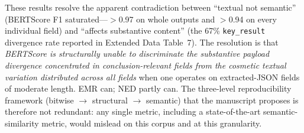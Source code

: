 \documentclass[11pt]{article}
\begin{document}
These results resolve the apparent contradiction between ``textual not semantic'' (BERTScore F1 saturated---$>$0.97 on whole outputs and $>$0.94 on every individual field) and ``affects substantive content'' (the 67\% \texttt{key\_result} divergence rate reported in Extended Data Table~7). The resolution is that \emph{BERTScore is structurally unable to discriminate the substantive payload divergence concentrated in conclusion-relevant fields from the cosmetic textual variation distributed across all fields} when one operates on extracted-JSON fields of moderate length. EMR can; NED partly can. The three-level reproducibility framework (bitwise $\rightarrow$ structural $\rightarrow$ semantic) that the manuscript proposes is therefore not redundant: any single metric, including a state-of-the-art semantic-similarity metric, would mislead on this corpus and at this granularity.
\end{document}
